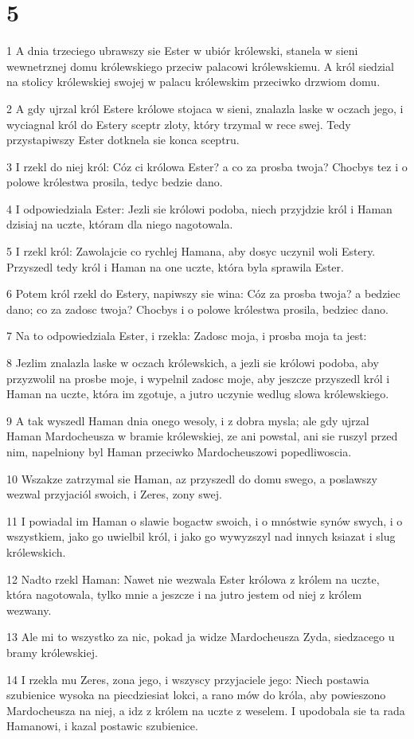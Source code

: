 \chapter{5}

\par 1 A dnia trzeciego ubrawszy sie Ester w ubiór królewski, stanela w sieni wewnetrznej domu królewskiego przeciw palacowi królewskiemu. A król siedzial na stolicy królewskiej swojej w palacu królewskim przeciwko drzwiom domu.
\par 2 A gdy ujrzal król Estere królowe stojaca w sieni, znalazla laske w oczach jego, i wyciagnal król do Estery sceptr zloty, który trzymal w rece swej. Tedy przystapiwszy Ester dotknela sie konca sceptru.
\par 3 I rzekl do niej król: Cóz ci królowa Ester? a co za prosba twoja? Chocbys tez i o polowe królestwa prosila, tedyc bedzie dano.
\par 4 I odpowiedziala Ester: Jezli sie królowi podoba, niech przyjdzie król i Haman dzisiaj na uczte, któram dla niego nagotowala.
\par 5 I rzekl król: Zawolajcie co rychlej Hamana, aby dosyc uczynil woli Estery. Przyszedl tedy król i Haman na one uczte, która byla sprawila Ester.
\par 6 Potem król rzekl do Estery, napiwszy sie wina: Cóz za prosba twoja? a bedziec dano; co za zadosc twoja? Chocbys i o polowe królestwa prosila, bedziec dano.
\par 7 Na to odpowiedziala Ester, i rzekla: Zadosc moja, i prosba moja ta jest:
\par 8 Jezlim znalazla laske w oczach królewskich, a jezli sie królowi podoba, aby przyzwolil na prosbe moje, i wypelnil zadosc moje, aby jeszcze przyszedl król i Haman na uczte, która im zgotuje, a jutro uczynie wedlug slowa królewskiego.
\par 9 A tak wyszedl Haman dnia onego wesoly, i z dobra mysla; ale gdy ujrzal Haman Mardocheusza w bramie królewskiej, ze ani powstal, ani sie ruszyl przed nim, napelniony byl Haman przeciwko Mardocheuszowi popedliwoscia.
\par 10 Wszakze zatrzymal sie Haman, az przyszedl do domu swego, a poslawszy wezwal przyjaciól swoich, i Zeres, zony swej.
\par 11 I powiadal im Haman o slawie bogactw swoich, i o mnóstwie synów swych, i o wszystkiem, jako go uwielbil król, i jako go wywyzszyl nad innych ksiazat i slug królewskich.
\par 12 Nadto rzekl Haman: Nawet nie wezwala Ester królowa z królem na uczte, która nagotowala, tylko mnie a jeszcze i na jutro jestem od niej z królem wezwany.
\par 13 Ale mi to wszystko za nic, pokad ja widze Mardocheusza Zyda, siedzacego u bramy królewskiej.
\par 14 I rzekla mu Zeres, zona jego, i wszyscy przyjaciele jego: Niech postawia szubienice wysoka na piecdziesiat lokci, a rano mów do króla, aby powieszono Mardocheusza na niej, a idz z królem na uczte z weselem. I upodobala sie ta rada Hamanowi, i kazal postawic szubienice.

